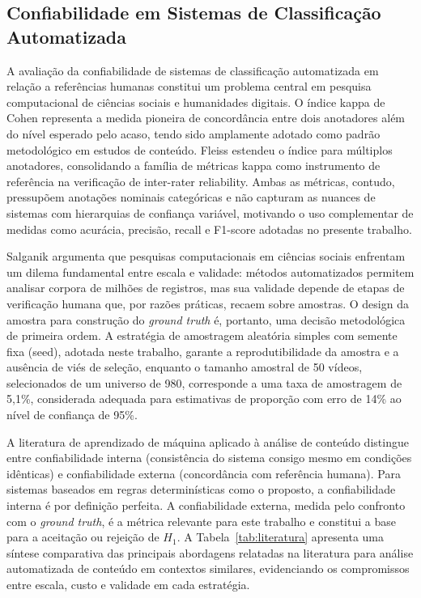 \documentclass[12pt, a4paper]{article}
\begin{document}
\subsection{Confiabilidade em Sistemas de Classificação Automatizada}

A avaliação da confiabilidade de sistemas de classificação automatizada em relação a referências humanas constitui um problema central em pesquisa computacional de ciências sociais e humanidades digitais. O índice kappa de Cohen \cite{cohen1960} representa a medida pioneira de concordância entre dois anotadores além do nível esperado pelo acaso, tendo sido amplamente adotado como padrão metodológico em estudos de conteúdo. Fleiss \cite{fleiss1971} estendeu o índice para múltiplos anotadores, consolidando a família de métricas kappa como instrumento de referência na verificação de inter-rater reliability. Ambas as métricas, contudo, pressupõem anotações nominais categóricas e não capturam as nuances de sistemas com hierarquias de confiança variável, motivando o uso complementar de medidas como acurácia, precisão, recall e F1-score adotadas no presente trabalho.

Salganik \cite{salganik2019} argumenta que pesquisas computacionais em ciências sociais enfrentam um dilema fundamental entre escala e validade: métodos automatizados permitem analisar corpora de milhões de registros, mas sua validade depende de etapas de verificação humana que, por razões práticas, recaem sobre amostras. O design da amostra para construção do \textit{ground truth} é, portanto, uma decisão metodológica de primeira ordem. A estratégia de amostragem aleatória simples com semente fixa (seed), adotada neste trabalho, garante a reprodutibilidade da amostra e a ausência de viés de seleção, enquanto o tamanho amostral de 50 vídeos, selecionados de um universo de 980, corresponde a uma taxa de amostragem de 5,1\%, considerada adequada para estimativas de proporção com erro de 14\% ao nível de confiança de 95\%.

A literatura de aprendizado de máquina aplicado à análise de conteúdo distingue entre confiabilidade interna (consistência do sistema consigo mesmo em condições idênticas) e confiabilidade externa (concordância com referência humana). Para sistemas baseados em regras determinísticas como o proposto, a confiabilidade interna é por definição perfeita. A confiabilidade externa, medida pelo confronto com o \textit{ground truth}, é a métrica relevante para este trabalho e constitui a base para a aceitação ou rejeição de $H_1$. A Tabela~\ref{tab:literatura} apresenta uma síntese comparativa das principais abordagens relatadas na literatura para análise automatizada de conteúdo em contextos similares, evidenciando os compromissos entre escala, custo e validade em cada estratégia.
\end{document}
